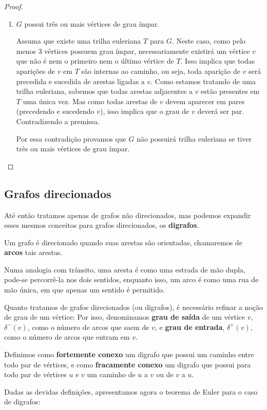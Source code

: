 \documentclass[12pt, a4paper]{article}
\begin{document}
\begin{proof}
\begin{enumerate}
        \item $G$ possui três ou mais vértices de grau ímpar. 

			Assuma que existe uma trilha euleriana $T$ para $G$. 
			Neste caso, como pelo menos 3 vértices possuem grau ímpar, necessariamente existirá um vértice $v$ que não é nem o primeiro nem o último vértice de $T$.
			Isso implica que todas aparições de $v$ em $T$ são internas ao caminho, ou seja, toda aparição de $v$ será precedida e sucedida de arestas ligadas a $v$.
			Como estamos tratando de uma trilha euleriana, sabemos que todas arestas adjacentes a $v$ estão presentes em $T$ uma única vez. 
			Mas como todas arestas de $v$ devem aparecer em pares (precedendo e sucedendo $v$), isso implica que o grau de $v$ deverá ser par.
			Contradizendo a premissa.

			Por essa contradição provamos que $G$ não possuirá trilha euleriana se tiver três ou mais vértices de grau ímpar.
    \end{enumerate}
\end{proof}

\subsection{Grafos direcionados}

Até então tratamos apenas de grafos não direcionados, mas podemos expandir esses mesmos conceitos para grafos direcionados, os \textbf{digrafos}.

Um grafo é direcionado quando suas arestas são orientadas, chamaremos de \textbf{arcos} tais arestas. 

Numa analogia com trânsito, uma aresta é como uma estrada de mão dupla, pode-se percorrê-la nos dois sentidos, enquanto isso, um arco é como uma rua de mão única, em que apenas um sentido é permitido.

Quanto tratamos de grafos direcionados (ou digrafos), é necessário refinar a noção de grau de um vértice:
Por isso, denominamos \textbf{grau de saída} de um vértice $v$, $\delta^-(v)$, como o número de arcos que saem de $v$, e \textbf{grau de entrada}, $\delta^+(v)$, como o número de arcos que entram em $v$. 

Definimos como \textbf{fortemente conexo} um digrafo que possui um caminho entre todo par de vértices, e como \textbf{fracamente conexo} um digrafo que possui para todo par de vértices $u$ e $v$ um caminho de $u$ a $v$ ou de $v$ a $u$.

Dadas as devidas definições, apresentamos agora o teorema de Euler para o caso de digrafos:
\end{document}
